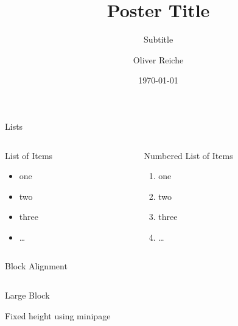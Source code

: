 \documentclass[t]{beamer}
\title{Poster Title}
\subtitle{Subtitle}
\author{Oliver Reiche}
\institute{Hardware/Software Co-Design, Friedrich-Alexander University Erlangen-N\"urnberg}
\date{\today}
\begin{document}
  \begin{frame}{}

    \vspace{3ex}

    \textcolor{faublue}{\huge Lists}

    \begin{columns}
      \begin{column}{.5\textwidth}

        \begin{block}{List of Items}
          \begin{itemize}
            \item one
            \item two
            \item three
            \item \dots
          \end{itemize}
        \end{block}

      \end{column}
      \begin{column}{.5\textwidth}

        \begin{block}{Numbered List of Items}
          \begin{enumerate}
            \item one
            \item two
            \item three
            \item \dots
          \end{enumerate}
        \end{block}

      \end{column}
    \end{columns}


    \textcolor{faublue}{\huge Block Alignment}

    \begin{columns}
      \begin{column}{0.5\textwidth}

        \begin{block}{Large Block}
          \begin{minipage}[t][8em][t]{\textwidth}
            Fixed height using minipage
          \end{minipage}
        \end{block}

      \end{column}
      \begin{column}{0.25\textwidth}


\end{column}
\end{columns}
\end{frame}
\end{document}
